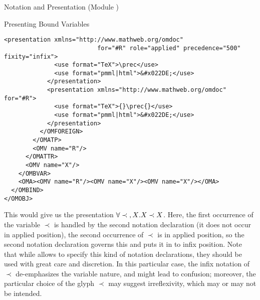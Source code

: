 \begin{tchapter}[id=pres,short=Notation and Presentation]{Notation and Presentation (Module {})}
\begin{tsection}[id=pres-bound]{Presenting Bound Variables}
\begin{lstlisting}[language=OpenMath,label=notation-om-function,
    caption={Notation for bound variables in {\openmath}},
    index={OMOBJ,OMBIND,OMS,OMBVAR,OMV,OMATTR,OMATP}]
            <presentation xmlns="http://www.mathweb.org/omdoc"
                          for="#R" role="applied" precedence="500" fixity="infix"> 
              <use format="TeX">\prec</use>
              <use format="pmml|html">&#x022DE;</use>
            </presentation>
            <presentation xmlns="http://www.mathweb.org/omdoc" for="#R"> 
              <use format="TeX">{}\prec{}</use>
              <use format="pmml|html">&#x022DE;</use>
            </presentation>
          </OMFOREIGN>
        </OMATP>
        <OMV name="R"/>                
      </OMATTR>
      <OMV name="X"/>
    </OMBVAR>
    <OMA><OMV name="R"/><OMV name="X"/><OMV name="X"/></OMA>
  </OMBIND>                         
</OMOBJ>
\end{lstlisting}
This would give us the presentation ${\forall{{}\prec{},X}.{X\prec X}}$. Here, the first
occurrence of the variable ${}\prec{}$ is handled by the second notation declaration (it
does not occur in applied position), the second occurrence of $\prec$ is in applied
position, so the second notation declaration governs this and puts it in to infix
position. Note that while {\omdoc} allows to specify this kind of notation declarations,
they should be used with great care and discretion.  In this particular case, the infix
notation of $\prec$ de-emphasizes the variable nature, and might lead to confusion;
moreover, the particular choice of the glyph $\prec$ may suggest irreflexivity, which may
or may not be intended.
\end{tsection}
\end{tchapter}


